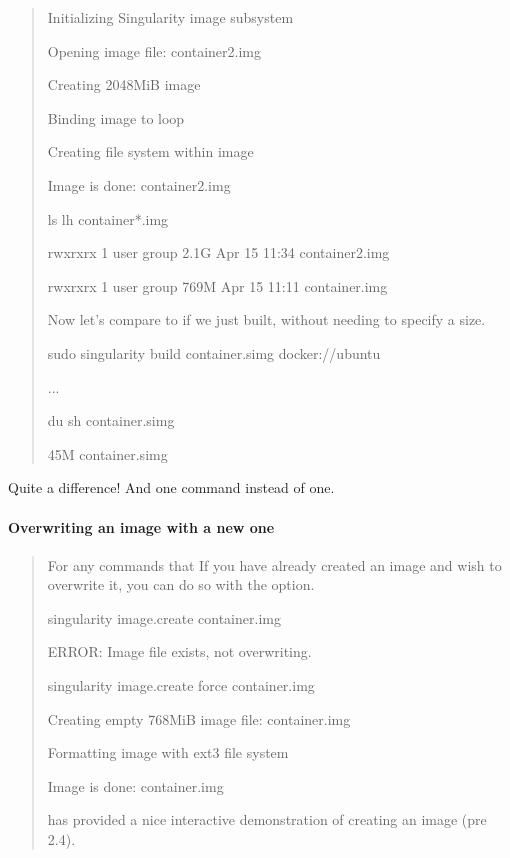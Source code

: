 \documentclass[letterpaper,10pt,english]{sphinxmanual}
\begin{document}
\begin{quote}
\begin{sphinxVerbatim}[commandchars=\\\{\}]
Initializing Singularity image subsystem

Opening image file: container2.img

Creating 2048MiB image

Binding image to loop

Creating file system within image

Image is done: container2.img


\PYGZdl{} ls \PYGZhy{}lh container*.img

\PYGZhy{}rwxr\PYGZhy{}xr\PYGZhy{}x 1 user group 2.1G Apr 15 11:34 container2.img

\PYGZhy{}rwxr\PYGZhy{}xr\PYGZhy{}x 1 user group 769M Apr 15 11:11 container.img
\end{sphinxVerbatim}

Now let’s compare to if we just built, without needing to specify a
size.

%
\begin{sphinxVerbatim}[commandchars=\\\{\}]
sudo singularity build container.simg docker://ubuntu


...


du \PYGZhy{}sh container.simg

45M container.simg
\end{sphinxVerbatim}
\end{quote}

Quite a difference! And one command instead of one.


\paragraph{Overwriting an image with a new one}
\label{\detokenize{appendix:overwriting-an-image-with-a-new-one}}\begin{quote}

For any commands that If you have already created an image and wish to
overwrite it, you can do so with the  option.

%
\begin{sphinxVerbatim}[commandchars=\\\{\}]
\PYGZdl{} singularity image.create container.img

ERROR: Image file exists, not overwriting.



\PYGZdl{} singularity image.create \PYGZhy{}\PYGZhy{}force container.img

Creating empty 768MiB image file: container.img

Formatting image with ext3 file system

Image is done: container.img
\end{sphinxVerbatim}

 has provided a nice interactive demonstration of creating an image (pre
2.4).
\end{quote}
\end{document}
